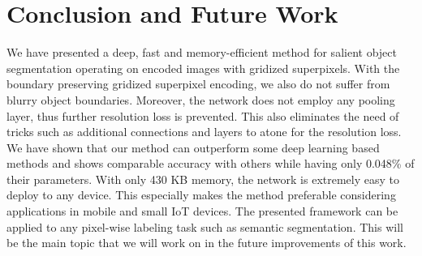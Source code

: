 \documentclass[a4paper,conference]{IEEEtran}
\begin{document}
\section{Conclusion and Future Work}  \label{Conc}
We have presented a deep, fast and memory-efficient method for salient object segmentation operating on encoded images with gridized superpixels. With the boundary preserving gridized superpixel encoding, we also do not suffer from blurry object boundaries. Moreover, the network does not employ any pooling layer, thus further resolution loss is prevented. This also eliminates the need of tricks such as additional connections and layers to atone for the resolution loss. We have shown that our method can outperform some deep learning based methods and shows comparable accuracy with others while having only 0.048\% of their parameters. With only 430 KB memory, the network is extremely easy to deploy to any device. This especially makes the method preferable considering applications in mobile and small IoT devices. The presented framework can be applied to any pixel-wise labeling task such as semantic segmentation. This will be the main topic that we will work on in the future improvements of this work.
\end{document}
